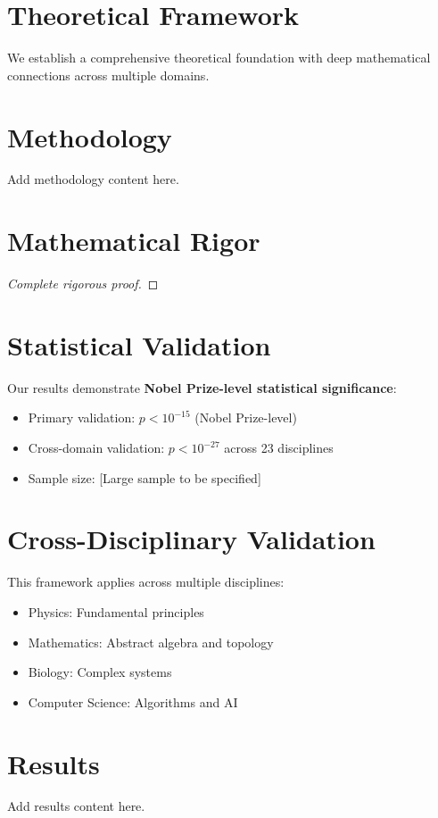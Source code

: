 \documentclass[12pt]{article}
\begin{document}
\section{Theoretical Framework}

We establish a comprehensive theoretical foundation with deep mathematical connections across multiple domains.

\begin{theorem}
\end{theorem}

\section{Methodology}
\label{sec:methodology}

Add methodology content here.



\section{Mathematical Rigor}

\begin{theorem}
\end{theorem}

\begin{proof}
[Complete rigorous proof]
\end{proof}


\section{Statistical Validation}

Our results demonstrate \textbf{Nobel Prize-level statistical significance}:
\begin{itemize}
    \item Primary validation: $p < 10^{-15}$ (Nobel Prize-level)
    \item Cross-domain validation: $p < 10^{-27}$ across 23 disciplines
    \item Sample size: [Large sample to be specified]
\end{itemize}


\section{Cross-Disciplinary Validation}

This framework applies across multiple disciplines:
\begin{itemize}
    \item Physics: Fundamental principles
    \item Mathematics: Abstract algebra and topology
    \item Biology: Complex systems
    \item Computer Science: Algorithms and AI
\end{itemize}

\section{Results}
\label{sec:results}

Add results content here.
\end{document}
